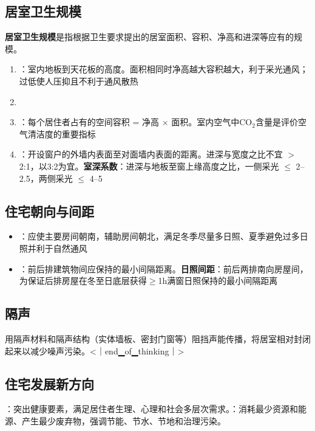 \subsection{居室卫生规模}

\textbf{居室卫生规模}是指根据卫生要求提出的居室面积、容积、净高和进深等应有的规模。

\begin{enumerate}[leftmargin=*]
    \item {}：室内地板到天花板的高度。面积相同时净高越大容积越大，利于采光通风；过低使人压抑且不利于通风散热
    \item {}
    \item {}：每个居住者占有的空间容积 = 净高 $\times$ 面积。室内空气中CO$_2$含量是评价空气清洁度的重要指标
    \item {}：开设窗户的外墙内表面至对面墙内表面的距离。进深与宽度之比不宜 $>$ 2:1，以3:2为宜。\textbf{室深系数}：进深与地板至窗上缘高度之比，一侧采光 $\leq$ 2--2.5，两侧采光 $\leq$ 4--5
\end{enumerate}

\subsection{住宅朝向与间距}

\begin{itemize}[leftmargin=*]
    \item {}：应使主要房间朝南，辅助房间朝北，满足冬季尽量多日照、夏季避免过多日照并利于自然通风
    \item {}：前后排建筑物间应保持的最小间隔距离。\textbf{日照间距}：前后两排南向房屋间，为保证后排房屋在冬至日底层获得$\geq$1h满窗日照保持的最小间隔距离
\end{itemize}

\subsection{隔声}

用隔声材料和隔声结构（实体墙板、密封门窗等）阻挡声能传播，将居室相对封闭起来以减少噪声污染。<｜end▁of▁thinking｜>

\subsection{住宅发展新方向}
：突出健康要素，满足居住者生理、心理和社会多层次需求。：消耗最少资源和能源、产生最少废弃物，强调节能、节水、节地和治理污染。

